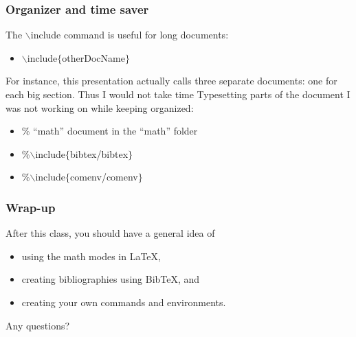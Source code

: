 \documentclass[slidestop,compress,mathserif]{beamer}
\begin{document}
\begin{frame}  \frametitle{Organizer and time saver}
The {\color{command}$\backslash$include} command is useful for long documents:
\vspace{1mm} \\
\begin{itemize}
\item[] {\color{command}$\backslash$include}{\color{braces}$\{${\color{black}otherDocName}$\}$}
\end{itemize}
\vspace{1mm}
For instance, this presentation actually calls three separate documents: one for each big section. Thus I would not take time Typesetting parts of the document I was not working on while keeping organized:
\vspace{1mm} \\
\begin{itemize}
\item[]  {\color{red}\% ``math'' document in the ``math'' folder}
\item[] {\color{red}\%$\backslash$include$\{${bibtex/bibtex}$\}$}
\item[] {\color{red}\%$\backslash$include$\{${comenv/comenv}$\}$}
\end{itemize}
\end{frame}

\begin{frame}  \frametitle{Wrap-up}
After this class, you should have a general idea of
\vspace{1mm} \\
\begin{itemize}
\item using the math modes in LaTeX,
\item creating bibliographies using BibTeX, and
\item creating your own commands and environments.
\end{itemize}
\vspace{1mm}
Any questions?
\end{frame}
\end{document}
